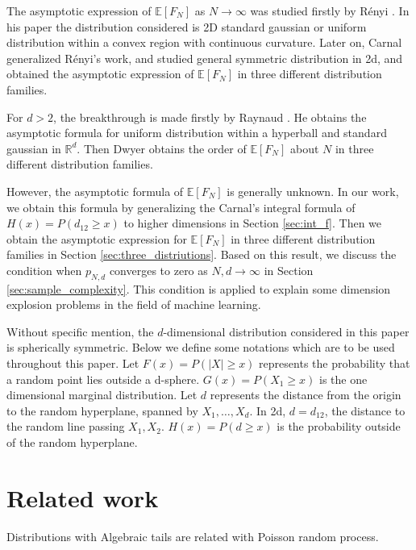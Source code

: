 \documentclass{aptpub}
\def\E{\mathbb{E}}
\begin{document}
The asymptotic expression of $\E[F_N]$ as $N\to \infty$
was studied firstly by R{\'e}nyi \cite{renyi1963konvexe}.
In his paper the distribution considered
is 2D standard gaussian or uniform distribution within a convex region with continuous curvature.
Later on, Carnal \cite{carnal1970konvexe} generalized R{\'e}nyi's work,
and studied general symmetric distribution in 2d,
and obtained the asymptotic expression of $\E[F_N]$
in three different distribution families.

For $d>2$, the breakthrough is made firstly by
Raynaud
\cite{raynaud1970enveloppe}.
He obtains the asymptotic formula for uniform distribution within a hyperball
and standard gaussian in $\mathbb{R}^d$.
Then Dwyer \cite{dwyer1991convex} obtains the order of $\E[F_N]$ about $N$
in three different distribution families.

However, the asymptotic formula of $\E[F_N]$ is generally unknown.
In our work, we obtain this formula by generalizing the Carnal's integral formula
of $H(x)=P(d_{12}\geq x)$ to higher dimensions in Section \ref{sec:int_f}.
Then we obtain the asymptotic
expression for $\E[F_N]$ in three different distribution families in Section \ref{sec:three_distriutions}.
Based on this result,
we discuss the condition when $p_{N,d}$ converges to zero as $N,d \to \infty$
in Section \ref{sec:sample_complexity}.
This condition is applied to explain some dimension explosion problems
in the field of machine learning.

Without specific mention, the $d$-dimensional distribution considered in this paper is spherically symmetric.
Below we define some notations which are to be used throughout this paper.
Let $F(x)=P(|X|\geq x)$ represents the probability that a random point lies outside
a d-sphere. $G(x)=P(X_1\geq x)$ is the one dimensional marginal distribution.
Let $d$ represents the distance from the origin to the random hyperplane, spanned by $X_1, \dots, X_d$.
In 2d, $d=d_{12}$, the distance to the random line passing $X_1, X_2$. $H(x)=P(d\geq x)$ is
the probability outside of the random hyperplane.
\section{Related work}

Distributions with Algebraic tails are related with Poisson random process.
\end{document}
